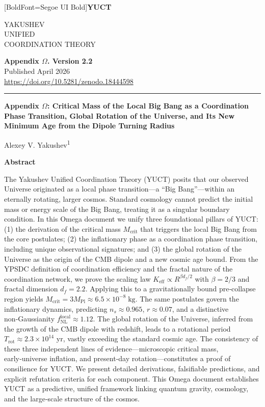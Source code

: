 \documentclass[12pt,a4paper]{article}
\newcommand{\makeheader}{%
	\noindent
	\begin{minipage}{0.17\textwidth}
		\raggedright
		{\fontspec{Segoe UI}[BoldFont=Segoe UI Bold]\bfseries\color{skyblue}\fontsize{46}{46}\selectfont YUCT}%
	\end{minipage}%
	\hspace{30pt}
	\begin{minipage}{0.32\textwidth}
		\raggedright
		{\sffamily\fontsize{11}{13}\selectfont YAKUSHEV\\ UNIFIED\\ COORDINATION THEORY}%
	\end{minipage}%
	\hfill
	\begin{minipage}{0.38\textwidth}
		\raggedleft
		{\sffamily\bfseries Appendix $\Omega$. Version 2.2}\\ 
		{\sffamily Published April 2026}\\ 
		{\sffamily\footnotesize \url{https://doi.org/10.5281/zenodo.18444598}}%
	\end{minipage}
	\par\vspace{5pt}
	\noindent\textcolor{gold}{\rule{\textwidth}{1.6pt}}
	\par\vspace{0pt}
}
\begin{document}
	\thispagestyle{firstpage}
	\makeheader
	
	\vspace{0cm}
{\LARGE\bfseries Appendix $\Omega$: Critical Mass of the Local Big Bang as a Coordination Phase Transition, Global Rotation of the Universe, and Its New Minimum Age from the Dipole Turning Radius \par}
	\vspace{0.2cm}
	
	{\large Alexey V. Yakushev\textsuperscript{1}} \\
	\vspace{0.0cm}
	
	{\color{darkblue}\textbf{\LARGE Abstract}} \par
	{\large
		\noindent
		The Yakushev Unified Coordination Theory (YUCT) posits that our observed Universe originated as a local phase transition—a “Big Bang”—within an eternally rotating, larger cosmos. Standard cosmology cannot predict the initial mass or energy scale of the Big Bang, treating it as a singular boundary condition. In this Omega document we unify three foundational pillars of YUCT: (1) the derivation of the critical mass \(M_{\mathrm{crit}}\) that triggers the local Big Bang from the core postulates; (2) the inflationary phase as a coordination phase transition, including unique observational signatures; and (3) the global rotation of the Universe as the origin of the CMB dipole and a new cosmic age bound. From the YPSDC definition of coordination efficiency and the fractal nature of the coordination network, we prove the scaling law \(K_{\mathrm{eff}} \propto R^{\beta d_f/2}\) with \(\beta = 2/3\) and fractal dimension \(d_f = 2.2\). Applying this to a gravitationally bound pre‑collapse region yields \(M_{\mathrm{crit}} = 3 M_{\mathrm{Pl}} \approx 6.5 \times 10^{-8}\;\text{kg}\). The same postulates govern the inflationary dynamics, predicting \(n_s \approx 0.965\), \(r \approx 0.07\), and a distinctive non‑Gaussianity \(f_{\mathrm{NL}}^{\mathrm{local}} \approx 1.12\). The global rotation of the Universe, inferred from the growth of the CMB dipole with redshift, leads to a rotational period \(T_{\mathrm{rot}} \approx 2.3 \times 10^{14}\) yr, vastly exceeding the standard cosmic age. The consistency of these three independent lines of evidence—microscopic critical mass, early‑universe inflation, and present-day rotation—constitutes a proof of consilience for YUCT. We present detailed derivations, falsifiable predictions, and explicit refutation criteria for each component. This Omega document establishes YUCT as a predictive, unified framework linking quantum gravity, cosmology, and the large‑scale structure of the cosmos.
	}
	
\end{document}
